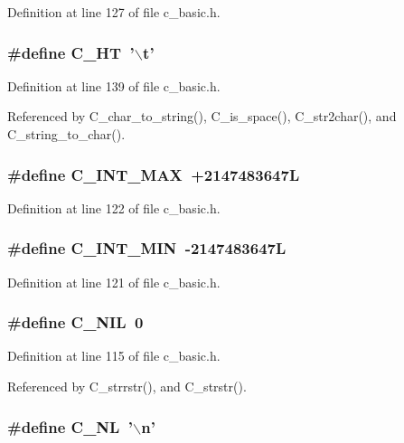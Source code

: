 Definition at line 127 of file c\_\-basic.h.
\subsubsection{\setlength{\rightskip}{0pt plus 5cm}\#define C\_\-HT~'$\backslash$t'}\label{c__basic_8h_8dfabdecbf022db0f20d911423ed37a3}




Definition at line 139 of file c\_\-basic.h.

Referenced by C\_\-char\_\-to\_\-string(), C\_\-is\_\-space(), C\_\-str2char(), and C\_\-string\_\-to\_\-char().
\subsubsection{\setlength{\rightskip}{0pt plus 5cm}\#define C\_\-INT\_\-MAX~+2147483647L}\label{c__basic_8h_44a854d1ea77f140afb067af3aa07f70}




Definition at line 122 of file c\_\-basic.h.
\subsubsection{\setlength{\rightskip}{0pt plus 5cm}\#define C\_\-INT\_\-MIN~-2147483647L}\label{c__basic_8h_a917371633a99a5aa6460d254465c44c}




Definition at line 121 of file c\_\-basic.h.
\subsubsection{\setlength{\rightskip}{0pt plus 5cm}\#define C\_\-NIL~0}\label{c__basic_8h_9449508e905de0437baf4a69bc5431ff}




Definition at line 115 of file c\_\-basic.h.

Referenced by C\_\-strrstr(), and C\_\-strstr().
\subsubsection{\setlength{\rightskip}{0pt plus 5cm}\#define C\_\-NL~'$\backslash$n'}\label{c__basic_8h_693706d15bad3b0dc0e5ef8eff40aaad}




